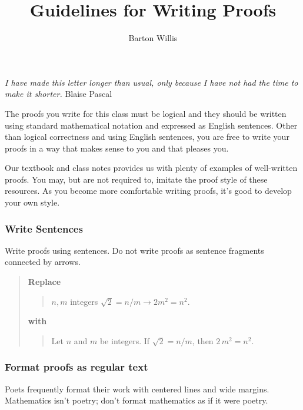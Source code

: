 \documentclass[12pt]{article}
\title{ Guidelines for Writing Proofs}
\author{Barton Willis}
\newcounter{ex}\setcounter{ex}{0}
\newcounter{id}\setcounter{id}{0}
\newcounter{se}\setcounter{se}{0}
\begin{document}
\maketitle



\begin{flushleft}
  \small
  \emph{I have made this letter longer than usual, only because I have
  not had the time to make it shorter.} \hfill {\sc Blaise Pascal}
\end{flushleft}

\normalsize
The proofs you write for this class must be logical and they should be 
written using standard mathematical notation and expressed as English sentences. Other than 
logical correctness and using English sentences, you are free to write your proofs
in a way that makes sense to you and that pleases you.

Our textbook and class notes provides us with plenty of examples of well-written proofs. You may,
but are not required to, imitate the proof style of these resources. As you become
more comfortable writing proofs, it's good to develop your own style.


\subsubsection{Write Sentences}

Write proofs using sentences. Do not write proofs as sentence fragments connected by 
arrows.
\begin{quote}
\textbf{Replace}
\begin{quote}
\(n,m\) integers \(\sqrt{2} = n / m  \longrightarrow 2 m^2 = n^2\). 
\end{quote}
\textbf{with}
\begin{quote}
Let \(n\) and \(m\) be integers. If \(\sqrt{2} = n / m\), then \(2 \, m^2 = n^2\).
\end{quote}
\end{quote}


\subsubsection{Format proofs as regular text}

Poets frequently format their work  with centered lines and wide
margins. Mathematics isn't poetry; don't format mathematics as if it were poetry.
\end{document}
